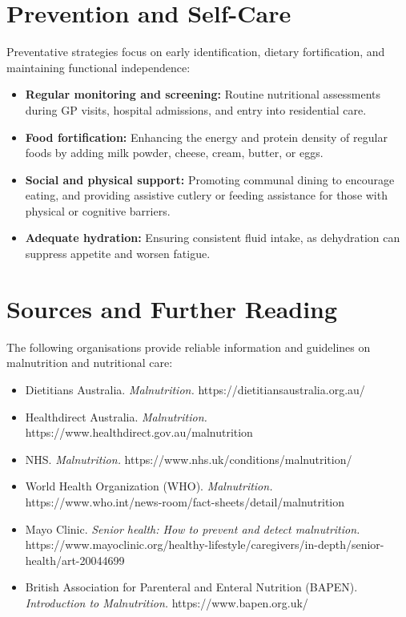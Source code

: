 \section*{Prevention and Self-Care}
Preventative strategies focus on early identification, dietary fortification, and maintaining functional independence:
\begin{itemize}
    \item \textbf{Regular monitoring and screening:} Routine nutritional assessments during GP visits, hospital admissions, and entry into residential care.
    \item \textbf{Food fortification:} Enhancing the energy and protein density of regular foods by adding milk powder, cheese, cream, butter, or eggs.
    \item \textbf{Social and physical support:} Promoting communal dining to encourage eating, and providing assistive cutlery or feeding assistance for those with physical or cognitive barriers.
    \item \textbf{Adequate hydration:} Ensuring consistent fluid intake, as dehydration can suppress appetite and worsen fatigue.
\end{itemize}

\section*{Sources and Further Reading}
The following organisations provide reliable information and guidelines on malnutrition and nutritional care:
\begin{itemize}
    \item Dietitians Australia. \textit{Malnutrition.} https://dietitiansaustralia.org.au/
    \item Healthdirect Australia. \textit{Malnutrition.} https://www.healthdirect.gov.au/malnutrition
    \item NHS. \textit{Malnutrition.} https://www.nhs.uk/conditions/malnutrition/
    \item World Health Organization (WHO). \textit{Malnutrition.} https://www.who.int/news-room/fact-sheets/detail/malnutrition
    \item Mayo Clinic. \textit{Senior health: How to prevent and detect malnutrition.} https://www.mayoclinic.org/healthy-lifestyle/caregivers/in-depth/senior-health/art-20044699
    \item British Association for Parenteral and Enteral Nutrition (BAPEN). \textit{Introduction to Malnutrition.} https://www.bapen.org.uk/
\end{itemize}
